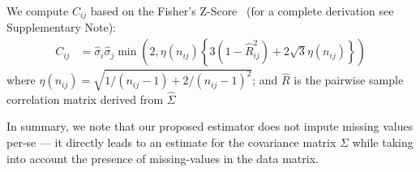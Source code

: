 



We compute $C_{ij}$ based on the Fisher's Z-Score~\cite{fisher1915, fisher1921} (for a complete derivation see Supplementary Note):
\begin{equation}\label{eq:defineC}
\begin{aligned}
    C_{ij} & = \hat{\sigma}_{i} \hat{\sigma}_{j} \min \left (2,  \eta (n_{ij})  \left \{ 3 (1 - \hat{R}^2_{ij}) + 2 \sqrt{3} \eta (n_{ij}) \right \} \right )
\end{aligned}
\end{equation}
where  $\eta(n_{ij})  = \sqrt{{1}/{(n_{ij} - 1)} + {2}/{(n_{ij} - 1)^2}}$;
and $\hat{R}$ is the pairwise sample correlation matrix derived from $\hat{\Sigma}$

In summary, we note that our proposed \Robocov{} estimator does not impute missing values per-se --- it directly leads to an estimate for the covariance matrix $\Sigma$ while taking into  account the presence of missing-values in the data matrix.  

